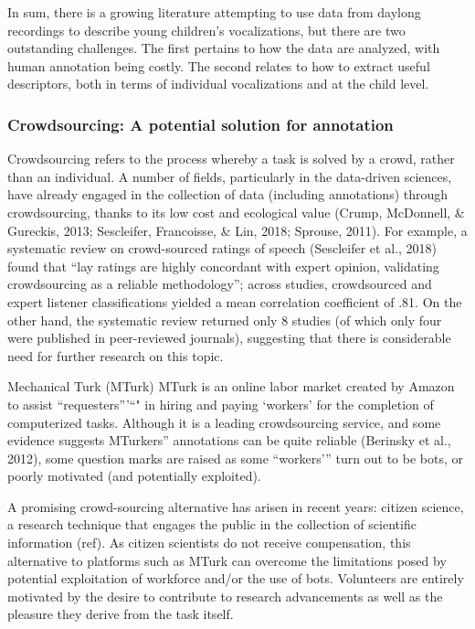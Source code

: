 \documentclass[english,,man,floatsintext]{apa6}
\begin{document}
In sum, there is a growing literature attempting to use data from daylong recordings to describe young children's vocalizations, but there are two outstanding challenges. The first pertains to how the data are analyzed, with human annotation being costly. The second relates to how to extract useful descriptors, both in terms of individual vocalizations and at the child level.

\hypertarget{crowdsourcing-a-potential-solution-for-annotation}{%
\subsubsection{Crowdsourcing: A potential solution for annotation}\label{crowdsourcing-a-potential-solution-for-annotation}}

Crowdsourcing refers to the process whereby a task is solved by a crowd, rather than an individual. A number of fields, particularly in the data-driven sciences, have already engaged in the collection of data (including annotations) through crowdsourcing, thanks to its low cost and ecological value (Crump, McDonnell, \& Gureckis, 2013; Sescleifer, Francoisse, \& Lin, 2018; Sprouse, 2011). For example, a systematic review on crowd-sourced ratings of speech (Sescleifer et al., 2018) found that \enquote{lay ratings are highly concordant with expert opinion, validating crowdsourcing as a reliable methodology}; across studies, crowdsourced and expert listener classifications yielded a mean correlation coefficient of .81. On the other hand, the systematic review returned only 8 studies (of which only four were published in peer-reviewed journals), suggesting that there is considerable need for further research on this topic.

Mechanical Turk (MTurk) MTurk is an online labor market created by Amazon to assist \enquote{requesters}'\enquote{" in hiring and paying \enquote{workers} for the completion of computerized tasks. Although it is a leading crowdsourcing service, and some evidence suggests MTurkers} annotations can be quite reliable (Berinsky et al., 2012), some question marks are raised as some \enquote{workers'} turn out to be bots, or poorly motivated (and potentially exploited).

A promising crowd-sourcing alternative has arisen in recent years: citizen science, a research technique that engages the public in the collection of scientific information (ref). As citizen scientists do not receive compensation, this alternative to platforms such as MTurk can overcome the limitations posed by potential exploitation of workforce and/or the use of bots. Volunteers are entirely motivated by the desire to contribute to research advancements as well as the pleasure they derive from the task itself.
\end{document}

